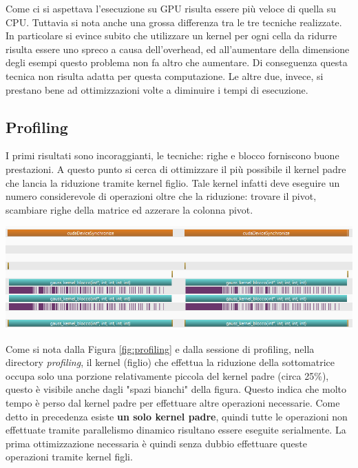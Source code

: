\documentclass{article}
\begin{document}
Come ci si aspettava l'esecuzione su GPU risulta essere più veloce di quella su CPU. Tuttavia si nota anche una grossa differenza tra le tre tecniche realizzate. In particolare si evince subito che utilizzare un kernel per ogni cella da ridurre risulta essere uno spreco a causa dell'overhead, ed all'aumentare della dimensione degli esempi questo problema non fa altro che aumentare. Di conseguenza questa tecnica non risulta adatta per questa computazione. Le altre due, invece, si prestano bene ad ottimizzazioni volte a diminuire i tempi di esecuzione.

\subsection{Profiling}
I primi risultati sono incoraggianti, le tecniche: righe e blocco forniscono buone prestazioni. A questo punto si cerca di ottimizzare il più possibile il kernel padre che lancia la riduzione tramite kernel figlio. Tale kernel infatti deve eseguire un numero considerevole di operazioni oltre che la riduzione: trovare il pivot, scambiare righe della matrice ed azzerare la colonna pivot. 
	\begin{center}
		\includegraphics[width = \textwidth]{profiling.png}
		\label{fig:profiling}
	\end{center}
	
Come si nota dalla Figura \ref{fig:profiling} e dalla sessione di profiling, nella directory \textit{profiling}, il kernel (figlio) che effettua la riduzione della sottomatrice occupa solo una porzione relativamente piccola del kernel padre (circa 25\%), questo è visibile anche dagli "spazi bianchi" della figura. Questo indica che molto tempo è perso dal kernel padre per effettuare altre operazioni necessarie. Come detto in precedenza esiste \textbf{un solo kernel padre}, quindi tutte le operazioni non effettuate tramite parallelismo dinamico risultano essere eseguite serialmente. La prima ottimizzazione necessaria è quindi senza dubbio effettuare queste operazioni tramite kernel figli.
\end{document}
